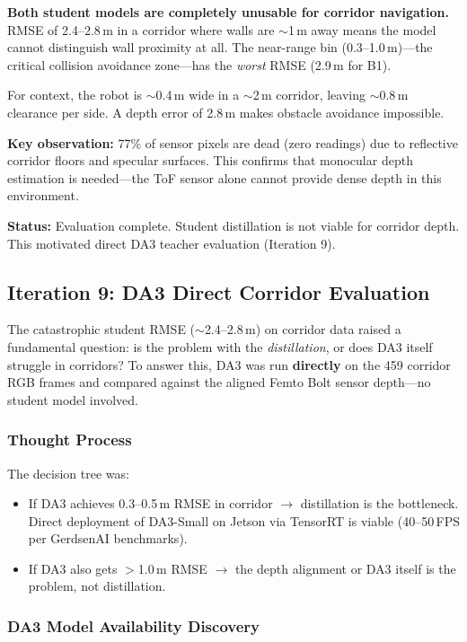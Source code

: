 \documentclass[11pt,a4paper]{article}
\begin{document}
\textbf{Both student models are completely unusable for corridor
navigation.} RMSE of 2.4--2.8\,m in a corridor where walls are
$\sim$1\,m away means the model cannot distinguish wall proximity at
all. The near-range bin (0.3--1.0\,m)---the critical collision avoidance
zone---has the \emph{worst} RMSE (2.9\,m for B1).

For context, the robot is $\sim$0.4\,m wide in a $\sim$2\,m corridor,
leaving $\sim$0.8\,m clearance per side. A depth error of 2.8\,m makes
obstacle avoidance impossible.

\textbf{Key observation:} 77\% of sensor pixels are dead (zero readings)
due to reflective corridor floors and specular surfaces. This confirms
that monocular depth estimation is needed---the ToF sensor alone cannot
provide dense depth in this environment.

\textbf{Status:} Evaluation complete. Student distillation is not viable
for corridor depth. This motivated direct DA3 teacher evaluation
(Iteration 9).

\subsection{Iteration 9: DA3 Direct Corridor Evaluation}
\label{sec:iter9}

The catastrophic student RMSE ($\sim$2.4--2.8\,m) on corridor data
raised a fundamental question: is the problem with the \emph{distillation},
or does DA3 itself struggle in corridors? To answer this, DA3 was run
\textbf{directly} on the 459 corridor RGB frames and compared against
the aligned Femto Bolt sensor depth---no student model involved.

\subsubsection{Thought Process}

The decision tree was:
\begin{itemize}[nosep]
  \item If DA3 achieves 0.3--0.5\,m RMSE in corridor $\to$ distillation
    is the bottleneck. Direct deployment of DA3-Small on Jetson via
    TensorRT is viable (40--50\,FPS per GerdsenAI benchmarks).
  \item If DA3 also gets $>$1.0\,m RMSE $\to$ the depth alignment or
    DA3 itself is the problem, not distillation.
\end{itemize}

\subsubsection{DA3 Model Availability Discovery}
\end{document}
